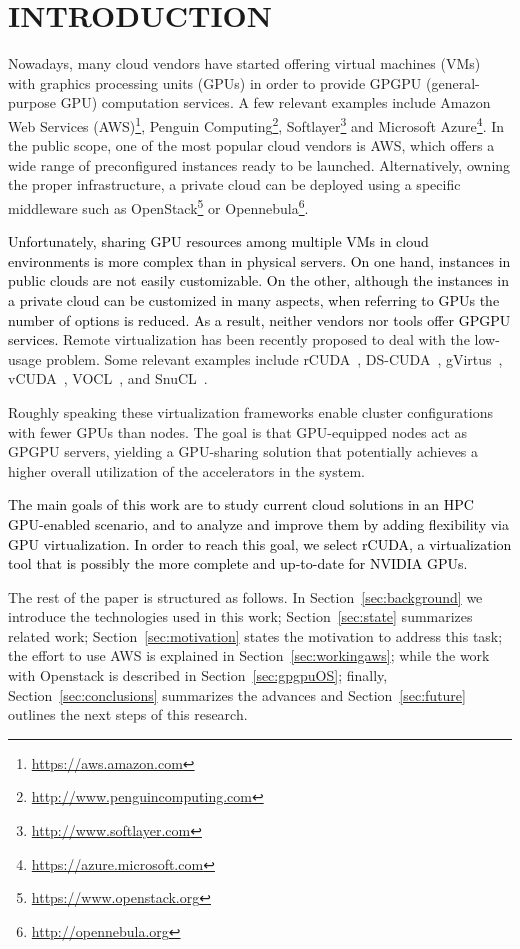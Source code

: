\documentclass[a4paper,twoside]{article}
\begin{document}
\section{\uppercase{Introduction}}
\label{sec:introduction}
Nowadays, many cloud vendors have started offering virtual machines (VMs) with graphics processing units (GPUs) in order to provide
GPGPU (general-purpose GPU) computation services. A few relevant examples include 
Amazon Web Services (AWS)\footnote{\url{https://aws.amazon.com}}, 
Penguin Computing\footnote{\url{http://www.penguincomputing.com}}, 
Softlayer\footnote{\url{http://www.softlayer.com}} and 
Microsoft Azure\footnote{\url{https://azure.microsoft.com}}.
In the public scope, one of the most popular cloud vendors is AWS, which offers a wide range of preconfigured instances ready to be launched.
Alternatively, owning the proper infrastructure, a private cloud can be deployed using a specific middleware such as
OpenStack\footnote{\url{https://www.openstack.org}} or Opennebula\footnote{\url{http://opennebula.org}}.

\textcolor{black}{
Unfortunately, sharing GPU resources among multiple VMs in cloud environments is more complex than in physical servers.
On one hand, instances in public clouds are not easily customizable. 
On the other, although the instances in a private cloud can be customized in many aspects, when referring to GPUs
the number of options is reduced.
As a result, neither vendors nor tools offer GPGPU services.
}
Remote virtualization has been recently proposed to deal with the low-usage problem. Some relevant examples include {rCUDA}~\cite{tonithesis},
DS-CUDA~\cite{dscuda}, gVirtus~\cite{gvirtus}, vCUDA~\cite{vcuda}, VOCL~\cite{vocl}, and SnuCL~\cite{snucl}.

Roughly speaking these virtualization frameworks 
enable cluster configurations with fewer GPUs than nodes.  The goal is that 
GPU-equipped nodes act as GPGPU servers, yielding a GPU-sharing solution that potentially achieves
a higher overall utilization of the accelerators in the system.

\textcolor{black}{
The main goals of this work are to study current cloud solutions in an HPC GPU-enabled scenario, and to analyze and improve 
them by adding flexibility via GPU virtualization. 
In order to reach this goal, we select rCUDA, a virtualization tool that is possibly the more complete and up-to-date for NVIDIA GPUs.
}

The rest of the paper is structured as follows. 
In Section~\ref{sec:background} we introduce the technologies used in this work;
Section~\ref{sec:state} summarizes related work; 
Section~\ref{sec:motivation} states the motivation to address this task;
the effort to use AWS is explained in Section~\ref{sec:workingaws};
while the work with Openstack is described in Section~\ref{sec:gpgpuOS};
finally, Section~\ref{sec:conclusions} summarizes the advances and Section~\ref{sec:future} outlines the next steps
 of this research.
\end{document}

